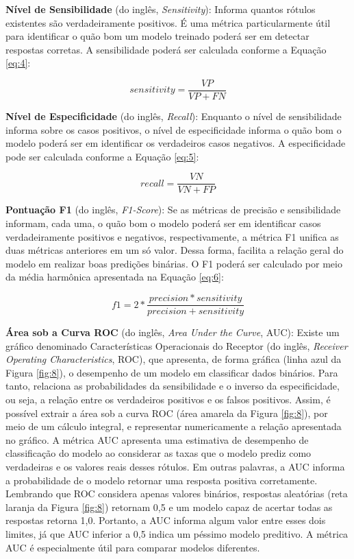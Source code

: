 \textbf{Nível de Sensibilidade} (do inglês, \textit{Sensitivity}): Informa quantos rótulos existentes são verdadeiramente positivos. É uma métrica particularmente útil para identificar o quão bom um modelo treinado poderá ser em detectar respostas corretas. A sensibilidade poderá ser calculada conforme a Equação \ref{eq:4}:

\begin{equation}
    \label{eq:4}
    sensitivity = \frac{VP}{VP+FN}
\end{equation}

\textbf{Nível de Especificidade} (do inglês, \textit{Recall}): Enquanto o nível de sensibilidade informa sobre os casos positivos, o nível de especificidade informa o quão bom o modelo poderá ser em identificar os verdadeiros casos negativos. A especificidade pode ser calculada conforme a Equação \ref{eq:5}:

\begin{equation}
    \label{eq:5}
    recall = \frac{VN}{VN+FP}
\end{equation}

\textbf{Pontuação F1} (do inglês, \textit{F1-Score}): Se as métricas de precisão e sensibilidade informam, cada uma, o quão bom o modelo poderá ser em identificar casos verdadeiramente positivos e negativos, respectivamente, a métrica F1 unifica as duas métricas anteriores em um só valor. Dessa forma, facilita a relação geral do modelo em realizar boas predições binárias. O F1 poderá ser calculado por meio da média harmônica apresentada na Equação \ref{eq:6}:

\begin{equation}
    \label{eq:6}
    f1 = 2*\frac{precision*sensitivity}{precision+sensitivity}
\end{equation}

\textbf{Área sob a Curva ROC} (do inglês, \textit{Area Under the Curve}, AUC): Existe um gráfico denominado Características Operacionais do Receptor (do inglês, \textit{Receiver Operating Characteristics}, ROC), que apresenta, de forma gráfica (linha azul da Figura \ref{fig:8}), o desempenho de um modelo em classificar dados binários. Para tanto, relaciona as probabilidades da sensibilidade e o inverso da especificidade, ou seja, a relação entre os verdadeiros positivos e os falsos positivos. Assim, é possível extrair a área sob a curva ROC (área amarela da Figura \ref{fig:8}), por meio de um cálculo integral, e representar numericamente a relação apresentada no gráfico. A métrica AUC apresenta uma estimativa de desempenho de classificação do modelo ao considerar as taxas que o modelo prediz como verdadeiras e os valores reais desses rótulos. Em outras palavras, a AUC informa a probabilidade de o modelo retornar uma resposta positiva corretamente. Lembrando que ROC considera apenas valores binários, respostas aleatórias (reta laranja da Figura \ref{fig:8}) retornam 0,5 e um modelo capaz de acertar todas as respostas retorna 1,0. Portanto, a AUC informa algum valor entre esses dois limites, já que AUC inferior a 0,5 indica um péssimo modelo preditivo. A métrica AUC é especialmente útil para comparar modelos diferentes.

